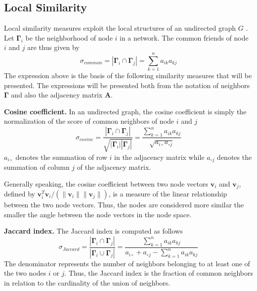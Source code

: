 \subsection{Local Similarity}
Local similarity measures exploit the local structures of an undirected graph $G$ \cite{fouss2016algorithms}. Let $\bm{\Gamma}_i$ be the neighborhood of node $i$ in a network. The common friends of node $i$ and $j$ are thus given by
\begin{equation}
\label{common}
\sigma_{common} = |\bm{\Gamma}_i \cap \bm{\Gamma}_j| = \sum_{k=1}^n a_{ik}a_{kj}
\end{equation}
The expression above is the basis of the following similarity measures that will be presented. The expressions will be presented both from the notation of neighbors $\bm{\Gamma}$ and also the adjacency matrix $\textbf{A}$.

\textbf{Cosine coefficient.} In an undirected graph, the cosine coefficient is simply the normalization of the score of common neighbors of node $i$ and $j$ \cite{fouss2016algorithms}
\begin{equation}
    \label{cosine}
    \sigma_{cosine} = \frac{|\bm{\Gamma}_i \cap \bm{\Gamma}_j|}{\sqrt{|\bm{\Gamma}_i||\bm{\Gamma}_j|}} = \frac{\sum_{k=1}^n a_{ik}a_{kj}}{\sqrt{a_{i \circ }a_{\circ j}}}
\end{equation}
$a_{i \circ }$ denotes the summation of row $i$ in the adjacency matrix while $a_{\circ j}$ denotes the summation of column $j$ of the adjacency matrix.

Generally speaking, the cosine coefficient between two node vectors $\textbf{v}_i$ and $\textbf{v}_j$, defined by $\textbf{v}_i^T\textbf{v}_i/(\|\textbf{v}_i\|\|\textbf{v}_j\|)$, is a measure of the linear relationship between the two node vectors. Thus, the nodes are considered more similar the smaller the angle between the node vectors in the node space.

\textbf{Jaccard index.} The Jaccard index is computed as follows
\begin{equation}
    \label{jaccard}
    \sigma_{Jaccard} = \frac{|\bm{\Gamma}_i \cap \bm{\Gamma}_j|}{|\bm{\Gamma}_i \cup \bm{\Gamma}_j|} = \frac{\sum_{k=1}^n a_{ik}a_{kj}}{a_{i \circ }+a_{\circ j}-\sum_{k=1}^n a_{ik}a_{kj}}
\end{equation}
The denominator represents the number of neighbors belonging to at least one of the two nodes $i$ or $j$. Thus, the Jaccard index is the fraction of common neighbors in relation to the cardinality of the union of neighbors. 


